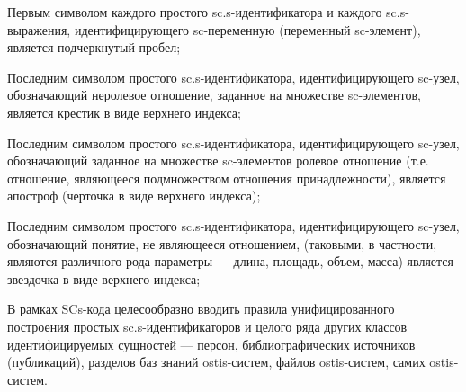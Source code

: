 \begin{SCn}
{\begin{scnitemize}
    \item Первым символом каждого простого sc.s-идентификатора и каждого sc.s-выражения, идентифицирующего sc-переменную (переменный sc-элемент), является подчеркнутый пробел;
    \item Последним символом простого sc.s-идентификатора, идентифицирующего sc-узел, обозначающий неролевое отношение, заданное на множестве sc-элементов, является крестик в виде верхнего индекса;
    \item Последним символом простого sc.s-идентификатора, идентифицирующего sc-узел, обозначающий заданное на множестве sc-элементов ролевое отношение (т.е. отношение, являющееся подмножеством отношения принадлежности), является апостроф (черточка в виде верхнего индекса);
    \item Последним символом простого sc.s-идентификатора, идентифицирующего sc-узел, обозначающий понятие, не являющееся отношением, (таковыми, в частности, являются различного рода параметры — длина, площадь, объем, масса) является звездочка в виде верхнего индекса;
    \item В рамках SCs-кода целесообразно вводить правила унифицированного построения простых sc.s-идентификаторов и целого ряда других классов идентифицируемых сущностей — персон, библиографических источников (публикаций), разделов баз знаний ostis-систем, файлов ostis-систем, самих ostis-систем.
\end{scnitemize}}




\end{SCn}
